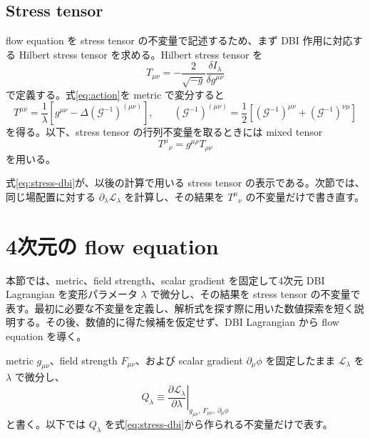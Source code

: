 \documentclass[a4paper,11pt]{ltjsarticle}
\numberwithin{equation}{section}
\newcommand{\Lag}{\mathcal L}
\newcommand{\G}{\mathcal G}
\begin{document}
\subsection{Stress tensor}

flow equation を stress tensor の不変量で記述するため、まず DBI 作用に対応する Hilbert stress tensor を求める。Hilbert stress tensor を
\begin{equation}
 T_{\mu\nu}
 =-\frac{2}{\sqrt{-g}}\frac{\delta I_\lambda}{\delta g^{\mu\nu}}
 \label{eq:stress-definition}
\end{equation}
で定義する。式\eqref{eq:action}を metric で変分すると
\begin{equation}
 T^{\mu\nu}
 =\frac1\lambda
 \left[g^{\mu\nu}-\Delta(\G^{-1})^{(\mu\nu)}\right],
 \qquad
 (\G^{-1})^{(\mu\nu)}
 =\frac12\left[(\G^{-1})^{\mu\nu}+(\G^{-1})^{\nu\mu}\right]
 \label{eq:stress-dbi}
\end{equation}
を得る。以下、stress tensor の行列不変量を取るときには mixed tensor
\begin{equation}
 T^\mu{}_{\nu}=g^{\mu\rho}T_{\rho\nu}
 \label{eq:mixed-T}
\end{equation}
を用いる。

式\eqref{eq:stress-dbi}が、以後の計算で用いる stress tensor の表示である。次節では、同じ場配置に対する $\partial_\lambda\Lag_\lambda$ を計算し、その結果を $T^\mu{}_{\nu}$ の不変量だけで書き直す。

\section{4次元の flow equation}
\label{sec:flow}

本節では、metric、field strength、scalar gradient を固定して4次元 DBI Lagrangian を変形パラメータ $\lambda$ で微分し、その結果を stress tensor の不変量で表す。最初に必要な不変量を定義し、解析式を探す際に用いた数値探索を短く説明する。その後、数値的に得た候補を仮定せず、DBI Lagrangian から flow equation を導く。

metric $g_{\mu\nu}$、field strength $F_{\mu\nu}$、および scalar gradient $\partial_\mu\phi$ を固定したまま $\Lag_\lambda$ を $\lambda$ で微分し、
\begin{equation}
 Q_\lambda\equiv
 \left.\frac{\partial\Lag_\lambda}{\partial\lambda}\right|_{g_{\mu\nu},\,F_{\mu\nu},\,\partial_\mu\phi}
 \label{eq:Q-definition}
\end{equation}
と書く。以下では $Q_\lambda$ を式\eqref{eq:stress-dbi}から作られる不変量だけで表す。
\end{document}
